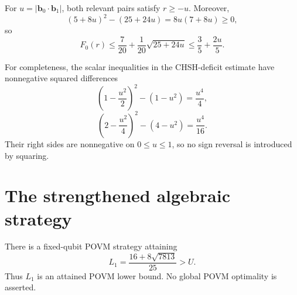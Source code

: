 For \(u=|\bm b_0\cdot\bm b_1|\), both relevant pairs satisfy \(r\ge-u\).
Moreover,
\[
(5+8u)^2-(25+24u)=8u(7+8u)\ge0,
\]
so
\[
F_0(r)\le\frac7{20}+\frac1{20}\sqrt{25+24u}
\le\frac35+\frac{2u}{5}.
\]

For completeness, the scalar inequalities in the CHSH-deficit estimate have
nonnegative squared differences
\[
\left(1-\frac{u^2}{2}\right)^2-(1-u^2)=\frac{u^4}{4},
\]
\[
\left(2-\frac{u^2}{4}\right)^2-(4-u^2)=\frac{u^4}{16}.
\]
Their right sides are nonnegative on \(0\le u\le1\), so no sign reversal is
introduced by squaring.

\section{The strengthened algebraic strategy}
\label{app:strengthened}

\begin{proposition}
\label{prop:strengthened-strategy}
There is a fixed-qubit POVM strategy attaining
\[
L_1=\frac{16+8\sqrt{7813}}{25}>U.
\]
Thus \(L_1\) is an attained POVM lower bound. No global POVM optimality is
asserted.
\end{proposition}

